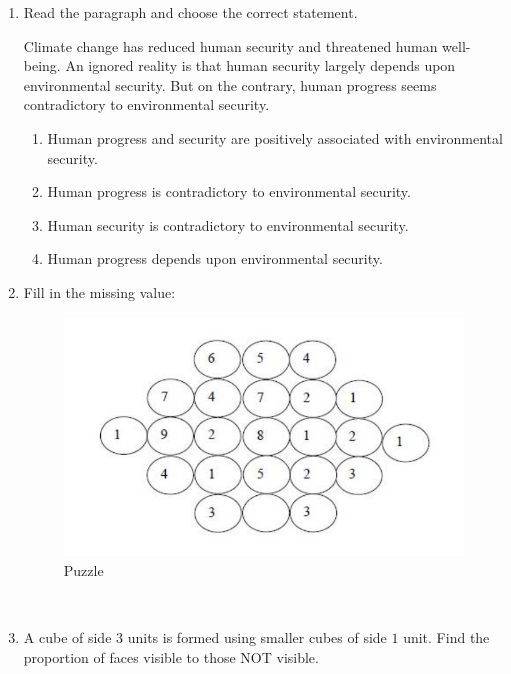 \documentclass[journal,12pt,onecolumn]{IEEEtran}
\begin{document}
\begin{enumerate}[label=\arabic*)]
\vspace{0.5cm}

\item Read the paragraph and choose the correct statement.  

Climate change has reduced human security and threatened human well-being. An ignored reality is that human security largely depends upon environmental security. But on the contrary, human progress seems contradictory to environmental security.  
\hfill{} \\

\vspace{0.2cm}
\begin{enumerate}[label=\alph*)]
\item Human progress and security are positively associated with environmental security.
\item Human progress is contradictory to environmental security.
\item Human security is contradictory to environmental security.
\item Human progress depends upon environmental security.
\end{enumerate}

\vspace{0.5cm}

\item Fill in the missing value:
\begin{figure}[htbp]
  \centering
  \includegraphics[width=.6\linewidth]{figs/GA/fig1.png}
  \caption{Puzzle}
  \label{GA/fig1}
\end{figure}

\hfill{} \\


\vspace{0.5cm}

\item A cube of side $3$ units is formed using smaller cubes of side $1$ unit. Find the proportion of faces visible to those NOT visible.
\hfill{} \\


\end{enumerate}
\end{document}
